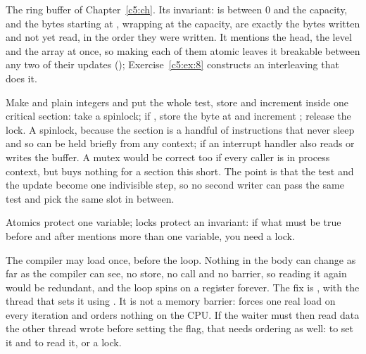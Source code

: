 
 The ring buffer of Chapter~\ref{c5:ch}. Its invariant:  is between 0 and the
capacity, and the  bytes starting at , wrapping at the capacity, are exactly
the bytes written and not yet read, in the order they were written. It mentions the head, the level
and the array at once, so making each of them atomic leaves it breakable between any two of their
updates (); Exercise~\ref{c5:ex:8} constructs an interleaving that does it.

 Make  and  plain integers and put the whole test, store and
increment inside one critical section: take a spinlock; if , store the byte
at  and increment ; release the lock. A spinlock,
because the section is a handful of instructions that never sleep and so can be held briefly from
any context;  if an interrupt handler also reads or writes the buffer. A
mutex would be correct too if every caller is in process context, but buys nothing for a section
this short. The point is that the test and the update become one indivisible step, so no second
writer can pass the same test and pick the same slot in between.

 Atomics protect one variable; locks protect an invariant: if what must be true before and
after mentions more than one variable, you need a lock.

 The compiler may load  once, before the loop. Nothing in the body can change
 as far as the compiler can see, no store, no call and no barrier, so reading it again
would be redundant, and the loop spins on a register forever. The fix is
, with the thread that sets it using
. It is not a memory barrier:  forces one real load on
every iteration and orders nothing on the CPU. If the waiter must then read data the other thread
wrote before setting the flag, that needs ordering as well:  to set it and
 to read it, or a lock.


